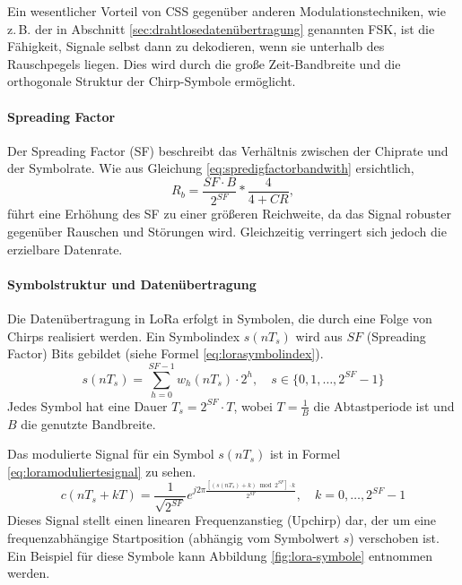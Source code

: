 Ein wesentlicher Vorteil von CSS gegenüber anderen Modulationstechniken, wie z.\,B. der in Abschnitt \ref{sec:drahtlosedatenübertragung} genannten FSK, ist die Fähigkeit, Signale selbst dann zu dekodieren, wenn sie unterhalb des Rauschpegels liegen. Dies wird durch die große Zeit-Bandbreite und die orthogonale Struktur der Chirp-Symbole ermöglicht.

\paragraph*{Spreading Factor} 
Der Spreading Factor (SF) beschreibt das Verhältnis zwischen der Chiprate und der Symbolrate. Wie aus Gleichung \ref{eq:spredigfactorbandwith} \cite[S.6]{rhode&schwarzCharacterizationLoRaDevices} ersichtlich, 
\begin{equation}
\label{eq:spredigfactorbandwith}
R_b = \frac{SF \cdot B}{2^{SF}} * \frac{4}{4 + CR},
\end{equation}
führt eine Erhöhung des SF zu einer größeren Reichweite, da das Signal robuster gegenüber Rauschen und Störungen wird. Gleichzeitig verringert sich jedoch die erzielbare Datenrate.


\paragraph*{Symbolstruktur und Datenübertragung}
Die Datenübertragung in LoRa erfolgt in Symbolen, die durch eine Folge von Chirps realisiert werden. Ein Symbolindex $s(nT_s)$ wird aus $SF$ (Spreading Factor) Bits gebildet (siehe Formel \ref{eq:lorasymbolindex}).
\begin{equation}
\label{eq:lorasymbolindex}
s(nT_s) = \sum_{h=0}^{SF-1} w_h(nT_s) \cdot 2^h, \quad s \in \{0,1,\dots,2^{SF}-1\}
\end{equation}
Jedes Symbol hat eine Dauer $T_s = 2^{SF} \cdot T$, wobei $T = \frac{1}{B}$ die Abtastperiode ist und $B$ die genutzte Bandbreite.

Das modulierte Signal für ein Symbol $s(nT_s)$ ist in Formel \ref{eq:loramoduliertesignal} zu sehen.
\begin{equation}
\label{eq:loramoduliertesignal}
c(nT_s + kT) = \frac{1}{\sqrt{2^{SF}}} e^{j 2\pi \frac{[(s(nT_s)+k) \bmod 2^{SF}] \cdot k}{2^{SF}}}, \quad k=0,\dots, 2^{SF}-1
\end{equation}
Dieses Signal stellt einen linearen Frequenzanstieg (Upchirp) dar, der um eine frequenzabhängige Startposition (abhängig vom Symbolwert $s$) verschoben ist. Ein Beispiel für diese Symbole kann Abbildung \ref{fig:lora-symbole} entnommen werden.

